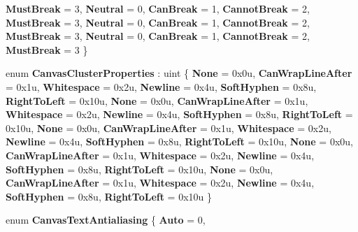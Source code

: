 \begin{DoxyCompactItemize}
{\bfseries Must\+Break} = 3, 
\newline
{\bfseries Neutral} = 0, 
{\bfseries Can\+Break} = 1, 
{\bfseries Cannot\+Break} = 2, 
{\bfseries Must\+Break} = 3, 
\newline
{\bfseries Neutral} = 0, 
{\bfseries Can\+Break} = 1, 
{\bfseries Cannot\+Break} = 2, 
{\bfseries Must\+Break} = 3, 
\newline
{\bfseries Neutral} = 0, 
{\bfseries Can\+Break} = 1, 
{\bfseries Cannot\+Break} = 2, 
{\bfseries Must\+Break} = 3
 \}
\item 
\mbox{\label{namespace_microsoft_1_1_graphics_1_1_canvas_1_1_text_ad08119da3ea5d8ada9d9d9166a9516e7}} 
enum {\bfseries Canvas\+Cluster\+Properties} \+: uint \{ \newline
{\bfseries None} = 0x0u, 
{\bfseries Can\+Wrap\+Line\+After} = 0x1u, 
{\bfseries Whitespace} = 0x2u, 
{\bfseries Newline} = 0x4u, 
\newline
{\bfseries Soft\+Hyphen} = 0x8u, 
{\bfseries Right\+To\+Left} = 0x10u, 
{\bfseries None} = 0x0u, 
{\bfseries Can\+Wrap\+Line\+After} = 0x1u, 
\newline
{\bfseries Whitespace} = 0x2u, 
{\bfseries Newline} = 0x4u, 
{\bfseries Soft\+Hyphen} = 0x8u, 
{\bfseries Right\+To\+Left} = 0x10u, 
\newline
{\bfseries None} = 0x0u, 
{\bfseries Can\+Wrap\+Line\+After} = 0x1u, 
{\bfseries Whitespace} = 0x2u, 
{\bfseries Newline} = 0x4u, 
\newline
{\bfseries Soft\+Hyphen} = 0x8u, 
{\bfseries Right\+To\+Left} = 0x10u, 
{\bfseries None} = 0x0u, 
{\bfseries Can\+Wrap\+Line\+After} = 0x1u, 
\newline
{\bfseries Whitespace} = 0x2u, 
{\bfseries Newline} = 0x4u, 
{\bfseries Soft\+Hyphen} = 0x8u, 
{\bfseries Right\+To\+Left} = 0x10u, 
\newline
{\bfseries None} = 0x0u, 
{\bfseries Can\+Wrap\+Line\+After} = 0x1u, 
{\bfseries Whitespace} = 0x2u, 
{\bfseries Newline} = 0x4u, 
\newline
{\bfseries Soft\+Hyphen} = 0x8u, 
{\bfseries Right\+To\+Left} = 0x10u
 \}
\item 
\mbox{\label{namespace_microsoft_1_1_graphics_1_1_canvas_1_1_text_ac5d7a4bab634cb1b3f6a231971b80974}} 
enum {\bfseries Canvas\+Text\+Antialiasing} \{ \newline
{\bfseries Auto} = 0, 

\end{DoxyCompactItemize}
